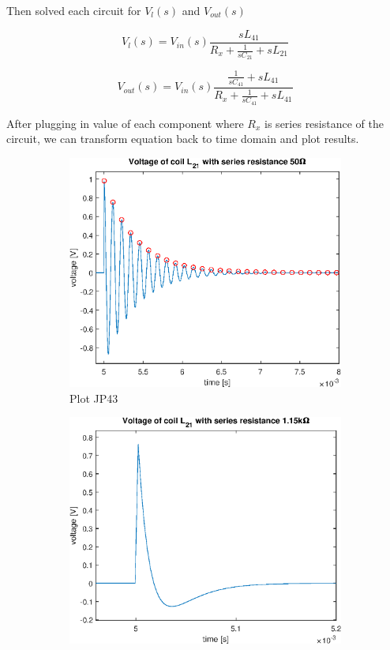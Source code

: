 \documentclass[notitlepage, a4paper, 11pt]{article}
\begin{document}
	Then solved each circuit for $V_l(s)$ and $V_{out}(s)$
	
	\begin{equation}
		V_l(s) = V_{in}(s)\dfrac{sL_{41}}{R_x + \frac{1}{sC_{21}} + sL_{21}}
	\end{equation}
	
	\begin{equation}
		V_{out}(s) = V_{in}(s) \dfrac{\frac{1}{sC_{41}}+sL_{41}}{R_x + \frac{1}{sC_{41}}+sL_{41}}
	\end{equation}
	
	After plugging in value of each component where $R_x$ is series resistance of the circuit, we can transform equation back to time domain and plot results.
	
	\begin{figure}[H]
		\centering
		\begin{subfigure}{0.45 \textwidth}
			\includegraphics[width=\textwidth]{../Matlab/img/CircuitC3}
			\caption{Plot JP43}
		\end{subfigure}
		\hfill
		\begin{subfigure}{0.45 \textwidth}
			\includegraphics[width=\textwidth]{../Matlab/img/CircuitC2}

\end{subfigure}
\end{figure}
\end{document}

